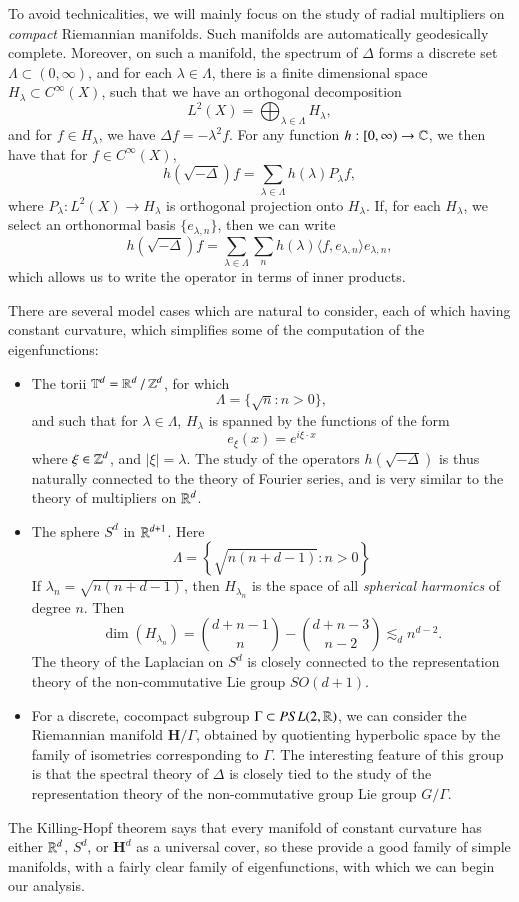 To avoid technicalities, we will mainly focus on the study of radial multipliers on \emph{compact} Riemannian manifolds. Such manifolds are automatically geodesically complete. Moreover, on such a manifold, the spectrum of $\Delta$ forms a discrete set $\Lambda \subset (0,\infty)$, and for each $\lambda \in \Lambda$, there is a finite dimensional space $H_\lambda \subset C^\infty(X)$, such that we have an orthogonal decomposition
%
\[ L^2(X) = \bigoplus_{\lambda \in \Lambda} H_\lambda, \]
%
and for $f \in H_\lambda$, we have $\Delta f = - \lambda^2 f$. For any function $h: [0,\infty) \to \operatorname{\mathbb{C}}$, we then have that for $f \in C^\infty(X)$,
%
\[ h(\sqrt{-\Delta}) f = \sum_{\lambda \in \Lambda} h(\lambda) P_\lambda f, \]
%
where $P_\lambda: L^2(X) \to H_\lambda$ is orthogonal projection onto $H_\lambda$. If, for each $H_\lambda$, we select an orthonormal basis $\{ e_{\lambda,n} \}$, then we can write
%
\[ h(\sqrt{-\Delta}) f = \sum_{\lambda \in \Lambda} \sum_n h(\lambda) \langle f, e_{\lambda,n} \rangle e_{\lambda,n}, \]
%
which allows us to write the operator in terms of inner products.

There are several model cases which are natural to consider, each of which having constant curvature, which simplifies some of the computation of the eigenfunctions:
%
\begin{itemize}
    \item The torii $\operatorname{\mathbb{T}}^d = \operatorname{\mathbb{R}}^d / \operatorname{\mathbb{Z}}^d$, for which
    \[ \Lambda = \{ \sqrt{n}: n > 0 \}, \]
    and such that for $\lambda \in \Lambda$, $H_\lambda$ is spanned by the functions of the form
    \[ e_\xi(x) = e^{i \xi \cdot x} \]
    where $\xi \in \operatorname{\mathbb{Z}}^d$, and $|\xi| = \lambda$. The study of the operators $h(\sqrt{-\Delta})$ is thus naturally connected to the theory of Fourier series, and is very similar to the theory of multipliers on $\operatorname{\mathbb{R}}^d$.

    \item The sphere $S^d$ in $\operatorname{\mathbb{R}}^{d+1}$. Here
    \[ \Lambda = \left\{ \sqrt{n(n+d-1)}: n > 0 \right\} \]
    If $\lambda_n = \sqrt{n(n+d-1)}$, then $H_{\lambda_n}$ is the space of all \emph{spherical harmonics} of degree $n$. Then
    \[ \dim(H_{\lambda_n}) = \binom{d + n - 1}{n} - \binom{d + n - 3}{n - 2} \lesssim_d n^{d-2}. \]
    The theory of the Laplacian on $S^d$ is closely connected to the representation theory of the non-commutative Lie group $SO(d+1)$.

    \item For a discrete, cocompact subgroup $\Gamma \subset PSL(2,\operatorname{\mathbb{R}})$, we can consider the Riemannian manifold $\mathbf{H} / \Gamma$, obtained by quotienting hyperbolic space by the family of isometries corresponding to $\Gamma$. The interesting feature of this group is that the spectral theory of $\Delta$ is closely tied to the study of the representation theory of the non-commutative group Lie group $G / \Gamma$.
\end{itemize}
%
The Killing-Hopf theorem says that every manifold of constant curvature has either $\operatorname{\mathbb{R}}^d$, $S^d$, or $\mathbf{H}^d$ as a universal cover, so these provide a good family of simple manifolds, with a fairly clear family of eigenfunctions, with which we can begin our analysis.


